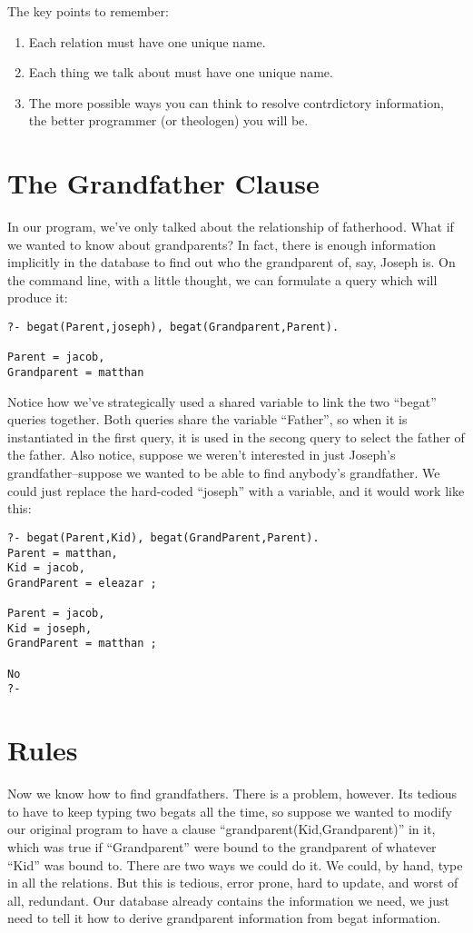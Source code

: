 \documentclass{book}[9pt]
\begin{document}
The key points to remember:
\begin{enumerate}
\item Each relation must have one unique name.
\item Each thing we talk about must have one unique name.
\item The more possible ways you can think to resolve contrdictory
  information, the better programmer (or theologen) you will be.
\end{enumerate}

\section{The Grandfather Clause}

In our program, we've only talked about the relationship of
fatherhood.  What if we wanted to know about grandparents?  In fact,
there is enough information implicitly in the database to find out who
the grandparent of, say, Joseph is.  On the command line, with a
little thought, we can formulate a query which will produce it:
\begin{verbatim}
?- begat(Parent,joseph), begat(Grandparent,Parent).

Parent = jacob,
Grandparent = matthan
\end{verbatim}
\noindent Notice how we've strategically used a shared variable to
link the two ``begat'' queries together.  Both queries share the
variable ``Father'', so when it is instantiated in the first query, it
is used in the secong query to select the father of the father.  Also
notice, suppose we weren't interested in just Joseph's
grandfather--suppose we wanted to be able to find anybody's
grandfather.  We could just replace the hard-coded ``joseph'' with a
variable, and it would work like this:
\begin{verbatim}
?- begat(Parent,Kid), begat(GrandParent,Parent). 
Parent = matthan,
Kid = jacob,
GrandParent = eleazar ;

Parent = jacob,
Kid = joseph,
GrandParent = matthan ;

No
?- 
\end{verbatim}

\section{Rules}

Now we know how to find grandfathers.  There is a problem, however.
Its tedious to have to keep typing two begats all the time,
so suppose we wanted to modify our original program to have a clause
``grandparent(Kid,Grandparent)'' in it, which was true if
``Grandparent'' were bound to the grandparent of whatever ``Kid'' was
bound to.  There are two ways we could do it.  We could, by hand, type
in all the relations.  But this is tedious, error prone, hard to
update, and worst of all, redundant.  Our database already contains
the information we need, we just need to tell it how to derive
grandparent information from begat information.
\end{document}
